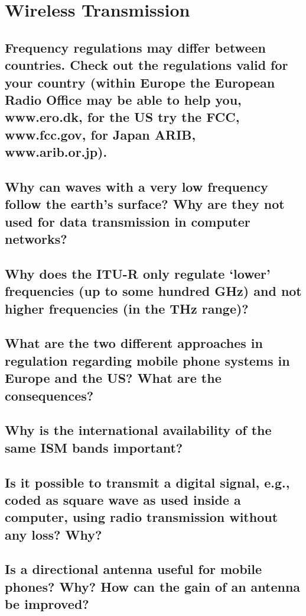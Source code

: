 \section{Wireless Transmission}

\subsection{Frequency regulations may differ between countries. Check out the regulations valid
for your country (within Europe the European Radio Office may be able to help you,
www.ero.dk, for the US try the FCC, www.fcc.gov, for Japan ARIB, www.arib.or.jp).}

\subsection{Why can waves with a very low frequency follow the earth’s surface? Why are they
not used for data transmission in computer networks?}

\subsection{Why does the ITU-R only regulate ‘lower’ frequencies (up to some hundred GHz) and
not higher frequencies (in the THz range)?}

\subsection{What are the two different approaches in regulation regarding mobile phone systems
in Europe and the US? What are the consequences?}

\subsection{Why is the international availability of the same ISM bands important?}

\subsection{Is it possible to transmit a digital signal, e.g., coded as square wave as used inside a
computer, using radio transmission without any loss? Why?}

\subsection{Is a directional antenna useful for mobile phones? Why? How can the gain of an
antenna be improved?}

